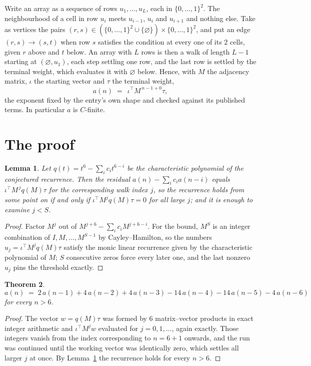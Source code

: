 \documentclass[11pt,a4paper]{article}
\theoremstyle{plain}
\newtheorem{theorem}{Theorem}
\newtheorem{lemma}[theorem]{Lemma}
\theoremstyle{definition}
\begin{document}
Write an array as a sequence of rows $u_1,\dots,u_L$, each in
$\{0,\dots,1\}^{2}$. The neighbourhood of a cell in row $u_i$ meets $u_{i-1}$,
$u_i$ and $u_{i+1}$ and nothing else. Take as vertices the pairs
$(r,s)\in(\{0,\dots,1\}^{2}\cup\{\varnothing\})\times\{0,\dots,1\}^{2}$,
and put an edge $(r,s)\to(s,t)$ when row $s$ satisfies the condition at every one of its
$2$ cells, given $r$ above and $t$ below. An array with $L$ rows is then a walk of length
$L-1$ starting at $(\varnothing,u_1)$, each step settling one row, and the last row is
settled by the terminal weight, which evaluates it with $\varnothing$ below. Hence,
with $M$ the adjacency matrix, $\iota$ the starting vector and $\tau$ the terminal weight,
\[
a(n)\;=\;\,\iota^{\!\top}M^{\,n-1+0}\tau ,
\]
the exponent fixed by the entry's own shape and checked against its published terms. In
particular $a$ is $C$-finite.

\section{The proof}

\begin{lemma}\label{lem:crit}
Let $q(t)=t^{6}-\sum_i c_it^{6-i}$ be the characteristic polynomial of the
conjectured recurrence. Then the residual $a(n)-\sum_ic_ia(n-i)$ equals
$\iota^{\!\top}M^{\,j}q(M)\tau$ for the corresponding walk index $j$, so the
recurrence holds from some point on if and only if $\iota^{\!\top}M^{j}q(M)\tau=0$ for all
large $j$; and it is enough to examine $j<S$.
\end{lemma}

\begin{proof}
Factor $M^{j}$ out of $M^{j+6}-\sum_ic_iM^{j+6-i}$. For the bound, $M^{S}$
is an integer combination of $I,M,\dots,M^{S-1}$ by Cayley--Hamilton, so the numbers
$u_j=\iota^{\!\top}M^{j}q(M)\tau$ satisfy the monic linear recurrence given by the
characteristic polynomial of $M$; $S$ consecutive zeros force every later one, and the last
nonzero $u_j$ pins the threshold exactly.
\end{proof}

\begin{theorem}
\[
a(n)\;=\;2\,a(n-1) + 4\,a(n-2) + 4\,a(n-3) - 14\,a(n-4) - 14\,a(n-5) - 4\,a(n-6)
\]
for every $n>6$.
\end{theorem}

\begin{proof}
The vector $w=q(M)\tau$ was formed by $6$ matrix--vector products in exact integer
arithmetic and $\iota^{\!\top}M^{j}w$ evaluated for $j=0,1,\dots$, again exactly. Those
integers vanish from the index corresponding to $n=6+1$ onwards, and the run was
continued until the working vector was identically zero, which settles all larger $j$ at once.
By Lemma~\ref{lem:crit} the recurrence holds for every $n>6$.
\end{proof}
\end{document}
